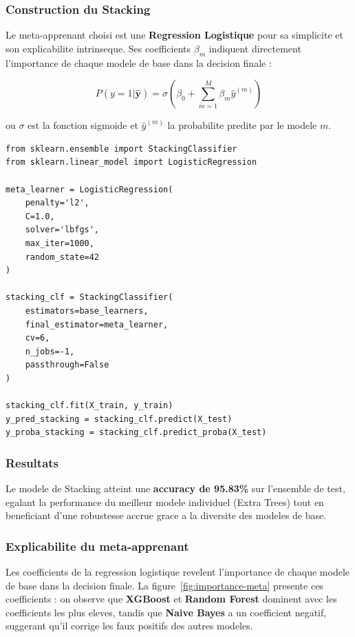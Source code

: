\subsubsection{Construction du Stacking}

Le meta-apprenant choisi est une \textbf{Regression Logistique} pour sa simplicite et son explicabilite intrinseque. Ses coefficients $\beta_m$ indiquent directement l'importance de chaque modele de base dans la decision finale :

\begin{equation}
    P(y=1 | \hat{\mathbf{y}}) = \sigma\left(\beta_0 + \sum_{m=1}^M \beta_m \hat{y}^{(m)}\right)
\end{equation}

ou $\sigma$ est la fonction sigmoide et $\hat{y}^{(m)}$ la probabilite predite par le modele $m$.

\begin{lstlisting}[style=reportPython, caption={Construction du Stacking avec validation croisee}]
from sklearn.ensemble import StackingClassifier
from sklearn.linear_model import LogisticRegression

meta_learner = LogisticRegression(
    penalty='l2',
    C=1.0,
    solver='lbfgs',
    max_iter=1000,
    random_state=42
)

stacking_clf = StackingClassifier(
    estimators=base_learners,
    final_estimator=meta_learner,
    cv=6,
    n_jobs=-1,
    passthrough=False
)

stacking_clf.fit(X_train, y_train)
y_pred_stacking = stacking_clf.predict(X_test)
y_proba_stacking = stacking_clf.predict_proba(X_test)
\end{lstlisting}

\subsubsection{Resultats}

Le modele de Stacking atteint une \textbf{accuracy de 95.83\%} sur l'ensemble de test, egalant la performance du meilleur modele individuel (Extra Trees) tout en beneficiant d'une robustesse accrue grace a la diversite des modeles de base.

\subsubsection{Explicabilite du meta-apprenant}

Les coefficients de la regression logistique revelent l'importance de chaque modele de base dans la decision finale. La figure~\ref{fig:importance-meta} presente ces coefficients : on observe que \textbf{XGBoost} et \textbf{Random Forest} dominent avec les coefficients les plus eleves, tandis que \textbf{Naive Bayes} a un coefficient negatif, suggerant qu'il corrige les faux positifs des autres modeles.

